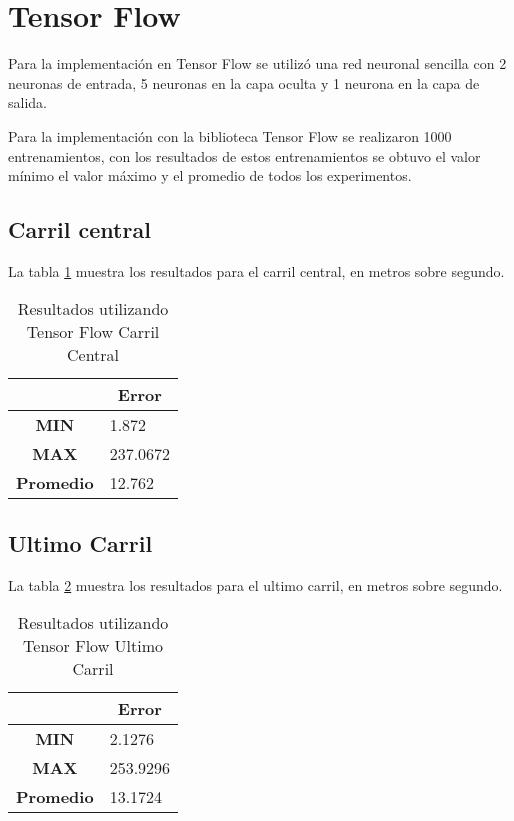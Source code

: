 \section{Tensor Flow}

Para la implementación en Tensor Flow se utilizó una red neuronal sencilla con 2 neuronas de entrada, 5 neuronas en la capa oculta y 1 neurona en la capa de salida.

Para la implementación con la biblioteca Tensor Flow se realizaron 1000 entrenamientos, con los resultados de estos entrenamientos se obtuvo el valor mínimo el valor máximo y el promedio de todos los experimentos.

\subsection{Carril central}

La tabla \ref{tab:resultadosTFCCentral} muestra los resultados para el carril central, en metros sobre segundo.


\begin{table}[H]
    \centering
    \caption{Resultados utilizando Tensor Flow Carril Central}
    \label{tab:resultadosTFCCentral}
    \begin{tabular}{|c|l|} \hline

    & \multicolumn{1}{c|}{\textbf{Error}} \\ \hline
    \textbf{MIN} & 1.872 \\ \hline
    \textbf{MAX} & 237.0672 \\ \hline
    \textbf{Promedio} & 12.762 \\ \hline
    \end{tabular}
\end{table}


\subsection{Ultimo Carril}

La tabla \ref{tab:resultadosTFCUltimo} muestra los resultados para el ultimo carril, en metros sobre segundo.

\begin{table}[H]
    \centering
    \caption{Resultados utilizando Tensor Flow Ultimo Carril}
    \label{tab:resultadosTFCUltimo}
    \begin{tabular}{|c|l|}\hline

    & \multicolumn{1}{c|}{\textbf{Error}} \\ \hline
    \textbf{MIN} & 2.1276 \\ \hline
    \textbf{MAX} & 253.9296 \\ \hline
    \textbf{Promedio} & 13.1724 \\ \hline
    \end{tabular}
\end{table}
